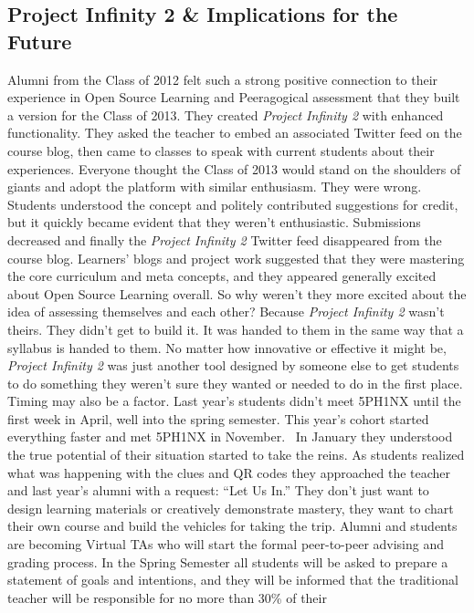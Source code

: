 \subsection{Project Infinity 2 \& Implications for the Future}

Alumni from the Class of 2012 felt such a strong positive connection to
their experience in Open Source Learning and Peeragogical assessment
that they built a version for the Class of 2013. They created
\emph{Project Infinity 2} with enhanced functionality. They asked the
teacher to embed an associated Twitter feed on the course blog, then
came to classes to speak with current students about their experiences.
Everyone thought the Class of 2013 would stand on the shoulders of
giants and adopt the platform with similar enthusiasm. They were wrong.
Students understood the concept and politely contributed suggestions for
credit, but it quickly became evident that they weren't enthusiastic.
Submissions decreased and finally the \emph{Project Infinity 2} Twitter
feed disappeared from the course blog. Learners' blogs and project work
suggested that they were mastering the core curriculum and meta
concepts, and they appeared generally excited about Open Source Learning
overall. So why weren't they more excited about the idea of assessing
themselves and each other? Because \emph{Project Infinity 2} wasn't
theirs. They didn't get to build it. It was handed to them in the same
way that a syllabus is handed to them. No matter how innovative or
effective it might be, \emph{Project Infinity 2} was just another tool
designed by someone else to get students to do something they weren't
sure they wanted or needed to do in the first place. Timing may also be
a factor. Last year's students didn't meet 5PH1NX until the first week
in April, well into the spring semester. This year's cohort started
everything faster and met 5PH1NX in November.~ In January they
understood the true potential of their situation started to take the
reins. As students realized what was happening with the clues and QR
codes they approached the teacher and last year's alumni with a request:
``Let Us In.'' They don't just want to design learning materials or
creatively demonstrate mastery, they want to chart their own course and
build the vehicles for taking the trip. Alumni and students are becoming
Virtual TAs who will start the formal peer-to-peer advising and grading
process. In the Spring Semester all students will be asked to prepare a
statement of goals and intentions, and they will be informed that the
traditional teacher will be responsible for no more than 30\% of their
